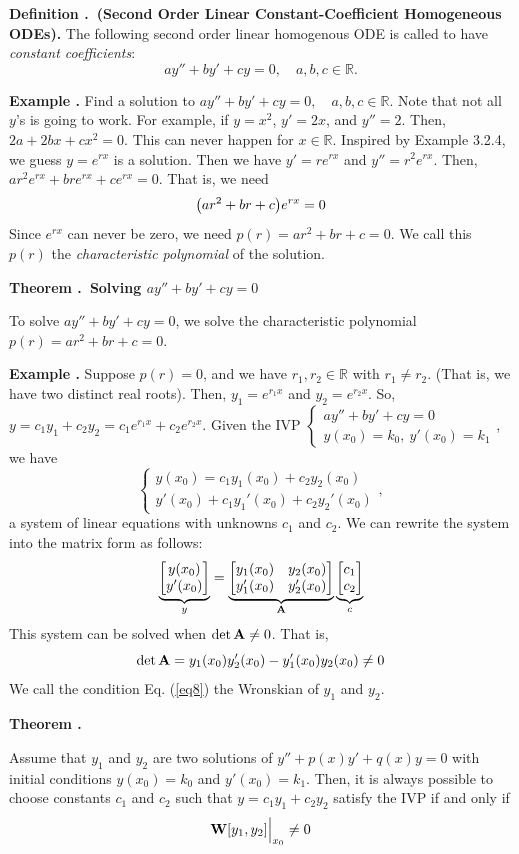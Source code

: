 \documentclass[12pt, a4paper]{article}
\newcounter{index}[subsection]
\newenvironment*{df}[1]{\par\noindent\textbf{Definition \thesubsection.\stepcounter{index}\theindex\ (#1).}}{\par}
\newenvironment*{eg}{\begin{framed}\par\noindent\textbf{Example \thesubsection.\stepcounter{index}\theindex}}{\par\end{framed}}
\newenvironment*{thm}[1]{\begin{tcolorbox}\par\noindent\textbf{Theorem \thesubsection.\stepcounter{index}\theindex\ #1} \par}{\par\end{tcolorbox}}
\def\R{{\mathbb{R}}}
\def\A{\vb A}
\def\W{\vb W}
\begin{document}
\begin{df}{Second Order Linear Constant-Coefficient Homogeneous ODEs}
	The following second order linear homogenous ODE is called to have \textit{constant coefficients}: \[ay''+by'+cy=0,\quad a,b,c\in\R.\]
\end{df}
\begin{eg}
	Find a solution to $ay''+by'+cy=0,\quad a,b,c\in\R$. Note that not all $y$'s is going to work. For example, if $y=x^2$, $y'=2x$, and $y''=2$. Then, $2a+2bx+cx^2=0$. This can never happen for $x\in\R$. Inspired by Example 3.2.4, we guess $y=e^{rx}$ is a solution. Then we have $y'=re^{rx}$ and $y''=r^2e^{rx}$. Then, $ar^2e^{rx}+bre^{rx}+ce^{rx}=0$. That is, we need \[\qty(ar^2+br+c)e^{rx}=0\] Since $e^{rx}$ can never be zero, we need $p(r)=ar^2+br+c=0$. We call this $p(r)$ the \textit{characteristic polynomial} of the solution.
\end{eg}
\begin{thm}{Solving $ay''+by'+cy=0$}
	To solve $ay''+by'+cy=0$, we solve the characteristic polynomial $p(r)=ar^2+br+c=0$.	
\end{thm}
\begin{eg}
	Suppose $p(r)=0$, and we have $r_1,r_2\in\R$ with $r_1\neq r_2$. (That is, we have two distinct real roots). Then, $y_1=e^{r_1x}$ and $y_2=e^{r_2x}$. So, $y=c_1y_1+c_2y_2=c_1e^{r_1x}+c_2e^{r_2x}$. Given the IVP $\begin{cases}ay''+by'+cy=0\\y(x_0)=k_0,\ y'(x_0)=k_1\end{cases}$, we have \[\begin{cases}y(x_0)=c_1y_1(x_0)+c_2y_2(x_0)\\y'(x_0)+c_1y_1'(x_0)+c_2y_2'(x_0)\end{cases}, \] a system of linear equations with unknowns $c_1$ and $c_2$. We can rewrite the system into the matrix form as follows: \[\underbrace{\mqty[y(x_0)\\y'(x_0)]}_y=\underbrace{\mqty[y_1(x_0)&y_2(x_0)\\y_1'(x_0)&y_2'(x_0)]}_{\A}\underbrace{\mqty[c_1\\c_2]}_c\] This system can be solved when $\det\A\neq0$. That is, \begin{equation}\label{eq8}\det\A=y_1(x_0)y_2'(x_0)-y_1'(x_0)y_2(x_0)\neq0\end{equation} We call the condition Eq. (\ref{eq8}) the Wronskian of $y_1$ and $y_2$.
\end{eg}
\begin{thm}{}
	Assume that $y_1$ and $y_2$ are two solutions of $y''+p(x)y'+q(x)y=0$ with initial conditions $y(x_0)=k_0$ and $y'(x_0)=k_1$. Then, it is always possible to choose constants $c_1$ and $c_2$ such that $y=c_1y_1+c_2y_2$ satisfy the IVP if and only if \[\W[y_1,y_2]\Big\rvert_{x_0}\neq0\]	
\end{thm}
\end{document}
